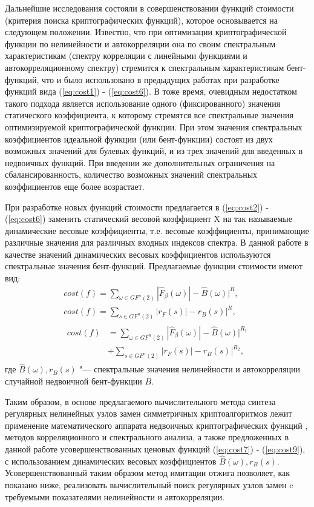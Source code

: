 Дальнейшие исследования состояли в совершенствовании функций стоимости (критерия
поиска криптографических функций), которое основывается на следующем положении.
Известно, что при оптимизации криптографической функции по нелинейности и
автокорреляции она по своим спектральным характеристикам (спектру корреляции с
линейными функциями и автокорреляционному спектру) стремится к спектральным
характеристикам бент-функций, что и было использовано в предыдущих работах
\cite{Clark1,Kavut} при разработке функций вида (\ref{eq:cost1}) -
(\ref{eq:cost6}). В тоже время, очевидным недостатком такого подхода является
использование одного (фиксированного) значения статического коэффициента, к
которому стремятся все спектральные значения оптимизируемой криптографической
функции. При этом значения спектральных коэффициентов идеальной функции (или
бент-функции) состоят из двух возможных значений для булевых функций, и из трех
значений для введенных в \cite{Kuznetsov} недвоичных функций. При введении же
дополнительных ограничения на сбалансированность, количество возможных значений
спектральных коэффициентов еще более возрастает. 

При разработке новых функций стоимости предлагается в (\ref{eq:cost2}) -
(\ref{eq:cost6}) заменить статический весовой коэффициент X на так называемые
динамические весовые коэффициенты, т.е. весовые коэффициенты, принимающие
различные значения для различных входных индексов спектра. В данной работе в
качестве значений динамических весовых коэффициентов используются спектральные
значения бент-функций. Предлагаемые функции стоимости имеют вид:
\begin{gather}
\label{eq:cost7}cost(f) = \sum_{\omega \in GF^{n}(2)}|\hat{F}_{\beta}(\omega)| - \hat{B}(\omega)|^R, \\
\label{eq:cost8}cost(f) = \sum_{s \in GF^{n}(2)}|r_{F}(s)| - r_{B}(s)|^R, \\
\label{eq:cost9}\begin{split}cost(f) &= \sum_{\omega \in GF^{n}(2)}|\hat{F}_{\beta}(\omega)| - \hat{B}(\omega)|^{R_1} \\
&+ \sum_{s \in GF^{n}(2)}|r_{F}(s)| - r_{B}(s)|^{R_2},\end{split}
\end{gather}
где $\hat{B}(\omega), r_{B}(s)$ "--- спектральные значения нелинейности и автокорреляции случайной недвоичной
бент-функции $B$.

Таким образом, в основе предлагаемого вычислительного метода синтеза регулярных
нелинейных узлов замен симметричных криптоалгоритмов лежит применение
математического аппарата недвоичных криптографических функций \cite{Kuznetsov}, методов
корреляционного и спектрального анализа, а также предложенных в данной работе
усовершенствованных ценовых функций (\ref{eq:cost7}) - (\ref{eq:cost9}), с
использованием динамических весовых коэффициентов $\hat{B}(\omega), r_{B}(s)$.
Усовершенствованный таким образом метод имитации отжига позволяет, как показано
ниже, реализовать вычислительный поиск регулярных узлов замен c требуемыми
показателями нелинейности и автокорреляции.


